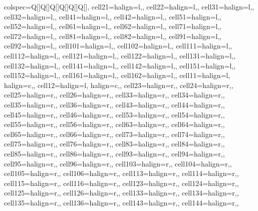 \begin{table}
\centering
\begin{talltblr}[         %
caption={Descriptive statistics of respondent characteristics, by treatment group status (exposure experiment)\label{tab:balance-table-exposure-experiment}},
]                     %
{                     %
colspec={Q[]Q[]Q[]Q[]Q[]Q[]},
cell{2}{1}={}{halign=l,},
cell{2}{2}={}{halign=l,},
cell{3}{1}={}{halign=l,},
cell{3}{2}={}{halign=l,},
cell{4}{1}={}{halign=l,},
cell{4}{2}={}{halign=l,},
cell{5}{1}={}{halign=l,},
cell{5}{2}={}{halign=l,},
cell{6}{1}={}{halign=l,},
cell{6}{2}={}{halign=l,},
cell{7}{1}={}{halign=l,},
cell{7}{2}={}{halign=l,},
cell{8}{1}={}{halign=l,},
cell{8}{2}={}{halign=l,},
cell{9}{1}={}{halign=l,},
cell{9}{2}={}{halign=l,},
cell{10}{1}={}{halign=l,},
cell{10}{2}={}{halign=l,},
cell{11}{1}={}{halign=l,},
cell{11}{2}={}{halign=l,},
cell{12}{1}={}{halign=l,},
cell{12}{2}={}{halign=l,},
cell{13}{1}={}{halign=l,},
cell{13}{2}={}{halign=l,},
cell{14}{1}={}{halign=l,},
cell{14}{2}={}{halign=l,},
cell{15}{1}={}{halign=l,},
cell{15}{2}={}{halign=l,},
cell{16}{1}={}{halign=l,},
cell{16}{2}={}{halign=l,},
cell{1}{1}={}{halign=l, halign=c,},
cell{1}{2}={}{halign=l, halign=c,},
cell{2}{3}={}{halign=r,},
cell{2}{4}={}{halign=r,},
cell{2}{5}={}{halign=r,},
cell{2}{6}={}{halign=r,},
cell{3}{3}={}{halign=r,},
cell{3}{4}={}{halign=r,},
cell{3}{5}={}{halign=r,},
cell{3}{6}={}{halign=r,},
cell{4}{3}={}{halign=r,},
cell{4}{4}={}{halign=r,},
cell{4}{5}={}{halign=r,},
cell{4}{6}={}{halign=r,},
cell{5}{3}={}{halign=r,},
cell{5}{4}={}{halign=r,},
cell{5}{5}={}{halign=r,},
cell{5}{6}={}{halign=r,},
cell{6}{3}={}{halign=r,},
cell{6}{4}={}{halign=r,},
cell{6}{5}={}{halign=r,},
cell{6}{6}={}{halign=r,},
cell{7}{3}={}{halign=r,},
cell{7}{4}={}{halign=r,},
cell{7}{5}={}{halign=r,},
cell{7}{6}={}{halign=r,},
cell{8}{3}={}{halign=r,},
cell{8}{4}={}{halign=r,},
cell{8}{5}={}{halign=r,},
cell{8}{6}={}{halign=r,},
cell{9}{3}={}{halign=r,},
cell{9}{4}={}{halign=r,},
cell{9}{5}={}{halign=r,},
cell{9}{6}={}{halign=r,},
cell{10}{3}={}{halign=r,},
cell{10}{4}={}{halign=r,},
cell{10}{5}={}{halign=r,},
cell{10}{6}={}{halign=r,},
cell{11}{3}={}{halign=r,},
cell{11}{4}={}{halign=r,},
cell{11}{5}={}{halign=r,},
cell{11}{6}={}{halign=r,},
cell{12}{3}={}{halign=r,},
cell{12}{4}={}{halign=r,},
cell{12}{5}={}{halign=r,},
cell{12}{6}={}{halign=r,},
cell{13}{3}={}{halign=r,},
cell{13}{4}={}{halign=r,},
cell{13}{5}={}{halign=r,},
cell{13}{6}={}{halign=r,},
cell{14}{3}={}{halign=r,},
cell{14}{4}={}{halign=r,},
}
\end{talltblr}
\end{table}
